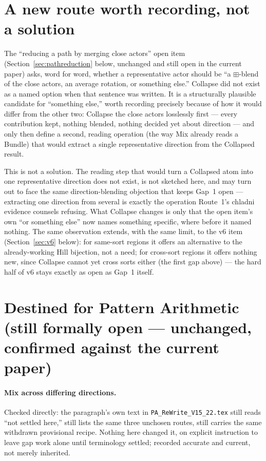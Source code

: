 \documentclass[11pt]{article}
\begin{document}
\section{A new route worth recording, not a solution}

The ``reducing a path by merging close actors'' open item
(Section~\ref{sec:pathreduction} below, unchanged and still open in the
current paper) asks, word for word, whether a representative actor
should be ``a $\boxplus$-blend of the close actors, an average
rotation, or something else.'' Collapse did not exist as a named
option when that sentence was written. It is a structurally plausible
candidate for ``something else,'' worth recording precisely because of
how it would differ from the other two: Collapse the close actors
losslessly first --- every contribution kept, nothing blended, nothing
decided yet about direction --- and only then define a second, reading
operation (the way Mix already reads a Bundle) that would extract a
single representative direction from the Collapsed result.

This is not a solution. The reading step that would turn a Collapsed
atom into one representative direction does not exist, is not sketched
here, and may turn out to face the same direction-blending objection
that keeps Gap~1 open --- extracting one direction from several is
exactly the operation Route~1's chladni evidence counsels refusing.
What Collapse changes is only that the open item's own ``or something
else'' now names something specific, where before it named nothing.
The same observation extends, with the same limit, to the v6
item (Section~\ref{sec:v6} below): for same-sort regions it offers an
alternative to the already-working Hill bijection, not a need; for
cross-sort regions it offers nothing new, since Collapse cannot yet
cross sorts either (the first gap above) --- the hard half of v6 stays
exactly as open as Gap~1 itself.

\section{Destined for Pattern Arithmetic (still formally open ---
unchanged, confirmed against the current paper)}
\label{sec:gap1}

\paragraph{Mix across differing directions.} Checked directly: the
paragraph's own text in \texttt{PA\_ReWrite\_V15\_22.tex} still reads
``not settled here,'' still lists the same three unchosen routes,
still carries the same withdrawn provisional recipe. Nothing here
changed it, on explicit instruction to leave gap work alone until
terminology settled; recorded accurate and current, not merely
inherited.
\end{document}
